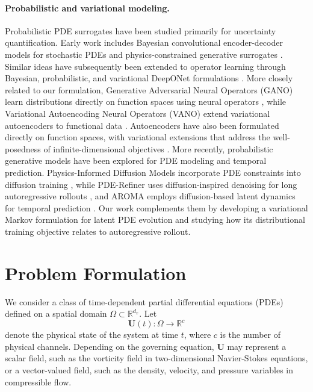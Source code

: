 \documentclass[11pt]{article}
\begin{document}
\paragraph{Probabilistic and variational modeling.} Probabilistic PDE surrogates have been studied primarily for uncertainty quantification. Early work includes Bayesian convolutional encoder-decoder models for stochastic PDEs and physics-constrained generative surrogates \citep{zhu2018bayesian,zhu2019physics}. Similar ideas have subsequently been extended to operator learning through Bayesian, probabilistic, and variational DeepONet formulations \citep{yang2022scalable,lin2023bdeeponet,garg2023vbdeeponet}. More closely related to our formulation, Generative Adversarial Neural Operators (GANO) learn distributions directly on function spaces using neural operators \citep{rahman2022generative}, while Variational Autoencoding Neural Operators (VANO) extend variational autoencoders to functional data \citep{seidman2023variational}. Autoencoders have also been formulated directly on function spaces, with variational extensions that address the well-posedness of infinite-dimensional objectives \citep{bunker2025autoencoders}. More recently, probabilistic generative models have been explored for PDE modeling and temporal prediction. Physics-Informed Diffusion Models incorporate PDE constraints into diffusion training \citep{bastek2025physics}, while PDE-Refiner uses diffusion-inspired denoising for long autoregressive rollouts \citep{lippe2023pde}, and AROMA employs diffusion-based latent dynamics for temporal prediction \citep{serrano2024latent,serrano2024aroma}. Our work complements them by developing a variational Markov formulation for latent PDE evolution and studying how its distributional training objective relates to autoregressive rollout.



\section{Problem Formulation}
\label{sec:problem_formulation}

We consider a class of time-dependent partial differential equations (PDEs) defined on a spatial domain $\Omega \subset \mathbb{R}^{d_x}$. Let
\[
    \mathbf{U}(t): \Omega \to \mathbb{R}^{c}
\]
denote the physical state of the system at time $t$, where $c$ is the number of physical channels. Depending on the governing equation, $\mathbf{U}$ may represent a scalar field, such as the vorticity field in two-dimensional Navier-Stokes equations, or a vector-valued field, such as the density,
velocity, and pressure variables in compressible flow.
\end{document}
